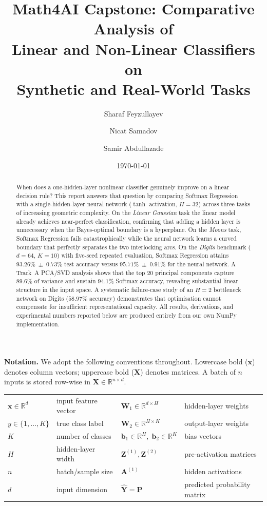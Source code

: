 \documentclass[11pt]{article}
\title{\textbf{Math4AI Capstone: Comparative Analysis of\\Linear and Non-Linear Classifiers on\\Synthetic and Real-World Tasks}}
\author{Sharaf Feyzullayev \and Nicat Samadov \and Samir Abdullazade}
\date{\today}
\newcommand{\R}{\mathbb{R}}
\newcommand{\bx}{\mathbf{x}}
\newcommand{\bX}{\mathbf{X}}
\newcommand{\bW}{\mathbf{W}}
\newcommand{\bb}{\mathbf{b}}
\newcommand{\bY}{\mathbf{Y}}
\newcommand{\bP}{\mathbf{P}}
\newcommand{\bZ}{\mathbf{Z}}
\newcommand{\bA}{\mathbf{A}}
\begin{document}
\maketitle

\begin{abstract}
When does a one-hidden-layer nonlinear classifier genuinely improve on a linear decision rule?
This report answers that question by comparing Softmax Regression with a single-hidden-layer
neural network ($\tanh$ activation, $H{=}32$) across three tasks of increasing geometric
complexity.  On the \emph{Linear Gaussian} task the linear model already achieves near-perfect
classification, confirming that adding a hidden layer is unnecessary when the Bayes-optimal
boundary is a hyperplane.  On the \emph{Moons} task, Softmax Regression fails
catastrophically while the neural network learns a curved boundary that perfectly separates the
two interlocking arcs.  On the \emph{Digits} benchmark ($d{=}64$, $K{=}10$) with five-seed
repeated evaluation, Softmax Regression attains $93.26\%\;\pm\;0.73\%$ test accuracy versus
$95.71\%\;\pm\;0.91\%$ for the neural network.  A Track~A PCA/SVD analysis shows that the top
20 principal components capture $89.6\%$ of variance and sustain $94.1\%$ Softmax accuracy,
revealing substantial linear structure in the input space.  A systematic failure-case study of an
$H{=}2$ bottleneck network on Digits ($58.97\%$ accuracy) demonstrates that optimisation cannot
compensate for insufficient representational capacity.  All results, derivations, and
experimental numbers reported below are produced entirely from our own NumPy implementation.
\end{abstract}

\vspace{-0.3em}
\noindent\textbf{Notation.}\;
We adopt the following conventions throughout.
Lowercase bold ($\bx$) denotes column vectors; uppercase bold ($\bX$) denotes matrices.
A batch of $n$ inputs is stored row-wise in $\bX\in\R^{n\times d}$.
\begin{center}
\small
\begin{tabular}{@{}ll@{\qquad}ll@{}}
\toprule
$\bx\in\R^{d}$ & input feature vector &
$\bW_1\!\in\!\R^{d\times H}$ & hidden-layer weights \\
$y\in\{1,\dots,K\}$ & true class label &
$\bW_2\!\in\!\R^{H\times K}$ & output-layer weights \\
$K$ & number of classes &
$\bb_1\!\in\!\R^{H},\;\bb_2\!\in\!\R^{K}$ & bias vectors \\
$H$ & hidden-layer width &
$\bZ^{(1)},\bZ^{(2)}$ & pre-activation matrices \\
$n$ & batch/sample size &
$\bA^{(1)}$ & hidden activations \\
$d$ & input dimension &
$\hat{\bY}\!=\!\bP$ & predicted probability matrix \\
\bottomrule
\end{tabular}
\end{center}
\end{document}
